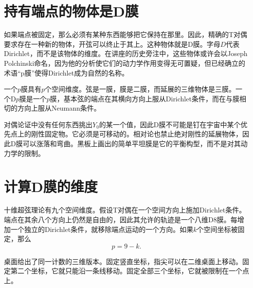 \section{持有端点的物体是D膜}

如果端点被固定，那么必须有某种东西能够把它保持在那里。因此，精确的T对偶要求存在一种新的物体，开弦可以终止于其上。这种物体就是D膜。字母\(D\)代表Dirichlet，而不是该物体的维度。在讲座的历史旁注中，这些物体或许会以Joseph Polchinski命名，因为他的分析使它们的动力学作用变得无可置疑，但已经确立的术语``p膜''使得Dirichlet成为自然的名称。

一个\(p\)膜具有\(p\)个空间维度。弦是一膜，膜是二膜，而延展的三维物体是三膜。一个D\(p\)膜是一个\(p\)膜，基本弦的端点在其横向方向上服从Dirichlet条件，而在与膜相切的方向上服从Neumann条件。

对偶论证中没有任何东西挑出\(Y_0\)的某一个值，因此D膜不可能是钉在宇宙中某个优先点上的刚性固定物。它必须是可移动的。相对论也禁止绝对刚性的延展物体，因此D膜可以涨落和弯曲。黑板上画出的简单平坦膜是它的平衡构型，而不是对其动力学的限制。

\begin{classroomqa}
\end{classroomqa}

\section{计算D膜的维度}

十维超弦理论有九个空间维度。假设T对偶在一个空间方向上施加Dirichlet条件。端点在其余八个方向上仍然是自由的，因此其允许的轨迹是一个八维D8膜。每增加一个独立的Dirichlet条件，就移除端点运动的一个方向。如果\(k\)个空间坐标被固定，那么
\begin{equation}
  p=9-k.
  \label{eq:l10-dp-counting}
\end{equation}

桌面给出了同一计数的三维版本。固定竖直坐标，指尖可以在二维桌面上移动。固定第二个坐标，它就只能沿一条线移动。固定全部三个坐标，它就被限制在一个点上。

